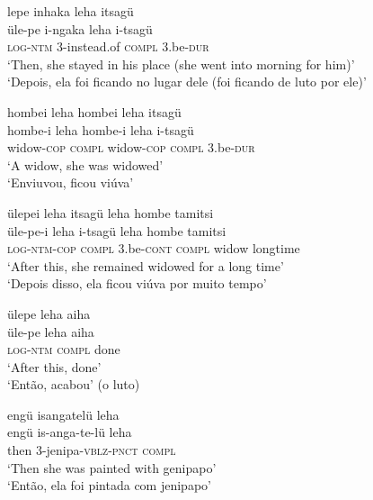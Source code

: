 \documentclass[output=paper,
modfonts,nonflat
]{langsci/langscibook}
\begin{document}
\ea  lepe inhaka leha itsagü \\[.3em]
\gll üle-pe		i-ngaka{\footnotemark}{} 	leha 		i-tsagü\\
\textsc{log}-\textsc{ntm}	3-instead.of	\textsc{compl} 	3.be-\textsc{dur}\\
\glt ‘Then, she stayed in his place (she went into morning for him)’ \\
‘Depois, ela foi ficando no lugar dele (foi ficando de luto por ele)’\\
\z

 \ea hombei leha hombei leha itsagü\\[.3em]
\gll hombe-i	leha	hombe-i	leha	i-tsagü\\
widow-\textsc{cop} 	\textsc{compl}  widow-\textsc{cop} 	\textsc{compl}  3.be-\textsc{dur} \\
\glt ‘A widow, she was widowed’\\
‘Enviuvou, ficou viúva’\\
\z
 
\ea ülepei leha itsagü leha hombe tamitsi\\[.3em]
\gll üle-pe-i	leha	i-tsagü		leha	hombe	tamitsi\\
\textsc{log}-\textsc{ntm}-\textsc{cop} 	\textsc{compl}  3.be-\textsc{cont} 	\textsc{compl}  widow 	longtime\\
\glt ‘After this, she remained widowed for a long time’\\
‘Depois disso, ela ficou viúva por muito tempo’\\
\z

\ea ülepe leha aiha\\[.3em]
\gll üle-pe leha aiha{\footnotemark}{} \\
\textsc{log}-\textsc{ntm} 	\textsc{compl}  	done \\
\glt ‘After this, done’ \\
‘Então, acabou’ (o luto)\\
\z

\ea engü isangatelü leha\\[.3em]
\gll engü	is-anga-te-lü		leha\\
then 	3-jenipa-\textsc{vblz}-\textsc{pnct} 	\textsc{compl} \\
\glt ‘Then she was painted with genipapo’\\
‘Então, ela foi pintada com jenipapo’\\
\z
\end{document}
